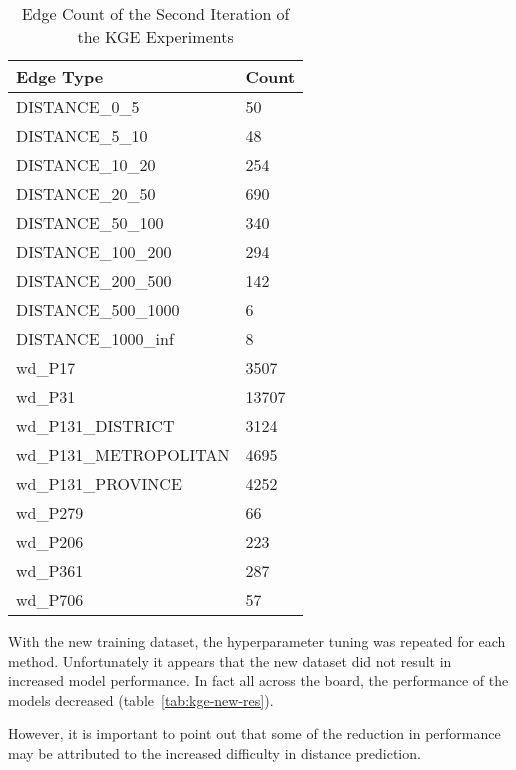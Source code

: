 \begin{table}[!ht]
    \centering
    \begin{tabular}{|l|l|}
        \hline
        \textbf{Edge Type } & \textbf{Count} \\ \hline
        DISTANCE\_0\_5 & 50 \\ \hline
        DISTANCE\_5\_10 & 48 \\ \hline
        DISTANCE\_10\_20 & 254 \\ \hline
        DISTANCE\_20\_50 & 690 \\ \hline
        DISTANCE\_50\_100 & 340 \\ \hline
        DISTANCE\_100\_200 & 294 \\ \hline
        DISTANCE\_200\_500 & 142 \\ \hline
        DISTANCE\_500\_1000 & 6 \\ \hline
        DISTANCE\_1000\_inf & 8 \\ \hline
        wd\_P17 & 3507 \\ \hline
        wd\_P31 & 13707 \\ \hline
        wd\_P131\_DISTRICT & 3124 \\ \hline
        wd\_P131\_METROPOLITAN & 4695 \\ \hline
        wd\_P131\_PROVINCE & 4252 \\ \hline
        wd\_P279 & 66 \\ \hline
        wd\_P206 & 223 \\ \hline
        wd\_P361 & 287 \\ \hline
        wd\_P706 & 57 \\ \hline
    \end{tabular}
    \caption{Edge Count of the Second Iteration of the KGE Experiments}
    \label{tab:kge-new-edges}
\end{table}

With the new training dataset, the hyperparameter tuning was repeated for each method.
Unfortunately it appears that the new dataset did not result in increased model performance.
In fact all across the board, the performance of the models decreased (table~\ref{tab:kge-new-res}).

However, it is important to point out that some of the reduction in performance may be attributed to the increased
difficulty in distance prediction.

